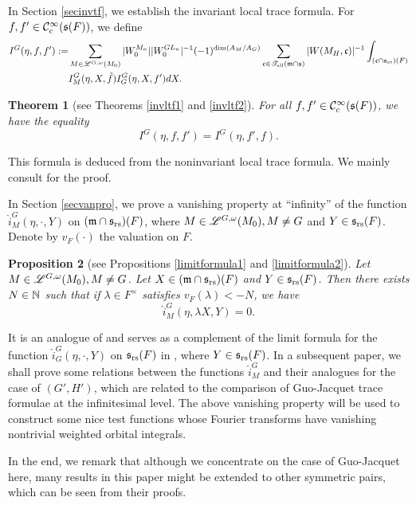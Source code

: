\documentclass[a4paper]{amsart}
\newcommand{\fm}{{\mathfrak{m}}} \newcommand{\fn}{{\mathfrak{n}}}\newcommand{\fo}{{\mathfrak{o}}} \newcommand{\fp}{{\mathfrak{p}}}
\newtheorem{thm}{Theorem}[section]
\newtheorem{prop}[thm]{Proposition}
\theoremstyle{definition}
\theoremstyle{remark}
\numberwithin{equation}{subsection}
\begin{document}
In Section \ref{secinvtf}, we establish the invariant local trace formula. For $f, f'\in{\mathcal {C}}_c^\infty({\mathfrak{s}}(F))$, we define 
\[\begin{split}
 I^G(\eta, f, f'):=&\sum_{M\in\msl^{G, \omega}(M_0)} |W_0^{M_n}| |W_0^{GL_n}|^{-1} (-1)^{\dim(A_M/A_G)} \sum_{\fc\in\mst_\el(\fm\cap\fs)} |W(M_H, \fc)|^{-1} \int_{(\fc\cap\fs_\rs)(F)} \\
 &I_M^G(\eta, X, \hat{f}) I_G^G(\eta, X, f') dX. 
\end{split}\]

\begin{thm}[see Theorems \ref{invltf1} and \ref{invltf2}]
For all $f, f'\in{\mathcal {C}}_c^\infty({\mathfrak{s}}(F))$, we have the equality
$$ I^G(\eta, f, f')=I^G(\eta, f', f). $$
\end{thm}

This formula is deduced from the noninvariant local trace formula. We mainly consult \cite[\S VII]{MR1344131} for the proof. 

In Section \ref{secvanpro}, we prove a vanishing property at ``infinity'' of the function $\hat{i}_M^G(\eta, \cdot, Y)$ on $(\fm\cap\fs_\rs)(F)$, where $M\in\mathscr{L}^{G,\omega}(M_0), M\neq G$ and $Y\in{\mathfrak{s}}_{\mathrm{rs}}(F)$. Denote by $v_F(\cdot)$ the valuation on $F$. 

\begin{prop}[see Propositions \ref{limitformula1} and \ref{limitformula2}]
Let $M\in\mathscr{L}^{G,\omega}(M_0), M\neq G$. Let $X\in(\fm\cap\fs_\rs)(F)$ and $Y\in{\mathfrak{s}}_{\mathrm{rs}}(F)$. Then there exists $N\in{\mathbb {N}}$ such that if $\lambda\in F^\times$ satisfies $v_F(\lambda)<-N$, we have
$$ \hat{i}_M^G(\eta, \lambda X, Y)=0. $$
\end{prop}

It is an analogue of \cite[Proposition 2.2]{MR2164623} and serves as a complement of the limit formula for the function $\hat{i}_G^G(\eta, \cdot, Y)$ on ${\mathfrak{s}}_{\mathrm{rs}}(F)$ in \cite[Proposition 7.1]{MR3414387}, where $Y\in{\mathfrak{s}}_{\mathrm{rs}}(F)$. In a subsequent paper, we shall prove some relations between the functions $\hat{i}_M^G$ and their analogues for the case of $(G',H')$, which are related to the comparison of Guo-Jacquet trace formulae at the infinitesimal level. The above vanishing property will be used to construct some nice test functions whose Fourier transforms have vanishing nontrivial weighted orbital integrals.  

In the end, we remark that although we concentrate on the case of Guo-Jacquet here, many results in this paper might be extended to other symmetric pairs, which can be seen from their proofs. 
\end{document}
